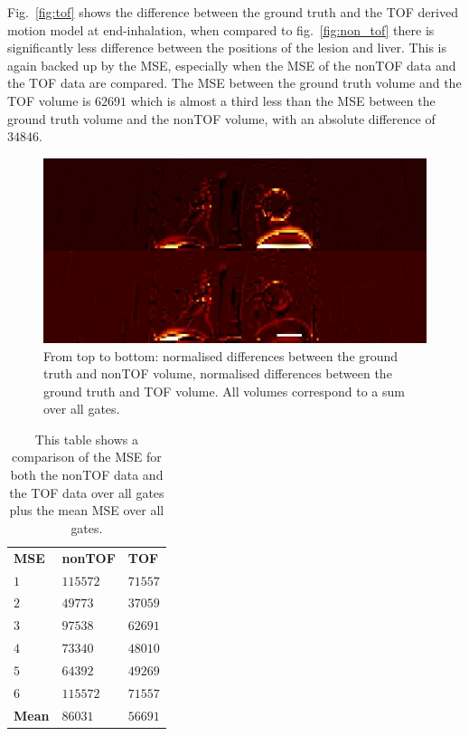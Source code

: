 \documentclass[journal]{IEEEtran}
\begin{document}
Fig.~\ref{fig:tof} shows the difference between the ground truth and the TOF derived motion model at end-inhalation, when compared to fig.~\ref{fig:non_tof} there is significantly less difference between the positions of the lesion and liver. This is again backed up by the MSE, especially when the MSE of the nonTOF data and the TOF data are compared. The MSE between the ground truth volume and the TOF volume is $62691$ which is almost a third less than the MSE between the ground truth volume and the nonTOF volume, with an absolute difference of $34846$.

\begin{figure}
    \centering
    \includegraphics[scale=0.4]{figures/sum.png}
    \caption{From top to bottom: normalised differences between the ground truth and nonTOF volume, normalised differences between the ground truth and TOF volume. All volumes correspond to a sum over all gates.}
    \label{fig:sum}
\end{figure}

\begin{table}
    \centering
    \begin{tabular}{lll}
        \textbf{MSE}    & \textbf{nonTOF}   & \textbf{TOF}  \\
        \textbf{$1$}    & $115572$          & $71557$       \\
        \textbf{$2$}    & $49773$           & $37059$       \\
        \textbf{$3$}    & $97538$           & $62691$       \\
        \textbf{$4$}    & $73340$           & $48010$       \\
        \textbf{$5$}    & $64392$           & $49269$       \\
        \textbf{$6$}    & $115572$          & $71557$       \\
        \textbf{Mean}   & $86031$           & $56691$       
    \end{tabular}
    \caption{This table shows a comparison of the MSE for both the nonTOF data and the TOF data over all gates plus the mean MSE over all gates.}
    \label{tab:mse}
\end{table}
\end{document}
